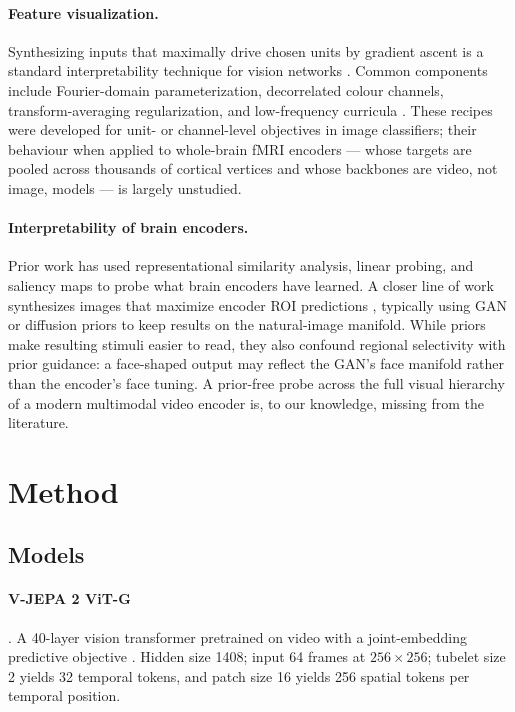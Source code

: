 \documentclass{article}
\begin{document}
\paragraph{Feature visualization.} Synthesizing inputs that maximally drive chosen units by gradient ascent is a standard interpretability technique for vision networks \citep{erhan2009visualizing,simonyan2013deep,olah2017featurevis}. Common components include Fourier-domain parameterization, decorrelated colour channels, transform-averaging regularization, and low-frequency curricula \citep{olah2017featurevis}. These recipes were developed for unit- or channel-level objectives in image classifiers; their behaviour when applied to whole-brain fMRI encoders --- whose targets are pooled across thousands of cortical vertices and whose backbones are video, not image, models --- is largely unstudied.

\paragraph{Interpretability of brain encoders.} Prior work has used representational similarity analysis, linear probing, and saliency maps to probe what brain encoders have learned. A closer line of work synthesizes images that maximize encoder ROI predictions \citep{walker2019inception,bashivan2019neural,ponce2019evolving,ratanmurty2021computational}, typically using GAN or diffusion priors to keep results on the natural-image manifold. While priors make resulting stimuli easier to read, they also confound regional selectivity with prior guidance: a face-shaped output may reflect the GAN's face manifold rather than the encoder's face tuning. A prior-free probe across the full visual hierarchy of a modern multimodal video encoder is, to our knowledge, missing from the literature.

\section{Method}

\subsection{Models}

\paragraph{V-JEPA 2 ViT-G} \citep[\texttt{facebook/vjepa2-vitg-fpc64-256}, fp16;][]{vjepa2}. A 40-layer vision transformer pretrained on video with a joint-embedding predictive objective \citep{lecun2022jepa}. Hidden size 1408; input 64 frames at $256\times256$; tubelet size 2 yields 32 temporal tokens, and patch size 16 yields 256 spatial tokens per temporal position.
\end{document}
